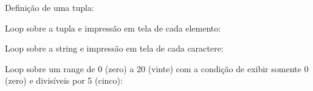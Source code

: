 \documentclass[letterpaper,10pt,brazil]{sphinxmanual}
\begin{document}
Definição de uma tupla:

\begin{sphinxVerbatim}[commandchars=\\\{\}]
     
\end{sphinxVerbatim}

Loop sobre a tupla e impressão em tela de cada elemento:

\begin{sphinxVerbatim}[commandchars=\\\{\}]
   
\end{sphinxVerbatim}

\begin{sphinxVerbatim}[commandchars=\\\{\}]
\end{sphinxVerbatim}

Loop sobre a string e impressão em tela de cada caractere:

\begin{sphinxVerbatim}[commandchars=\\\{\}]
   
\end{sphinxVerbatim}

\begin{sphinxVerbatim}[commandchars=\\\{\}]
\end{sphinxVerbatim}

Loop sobre um range de 0 (zero) a 20 (vinte) com a condição de exibir somente 0 (zero) e divisíveis por 5 (cinco):

\begin{sphinxVerbatim}[commandchars=\\\{\}]
   
         
\end{sphinxVerbatim}
\end{document}
